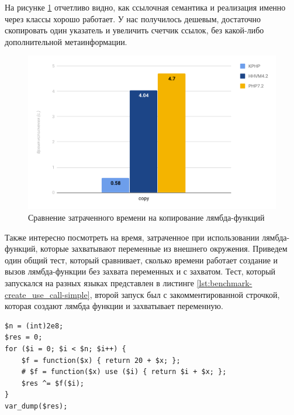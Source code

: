 На рисунке \ref{fig:benchmark-copy-simple} отчетливо видно, как ссылочная семантика и реализация именно через классы хорошо работает.
У нас получилось дешевым, достаточно скопировать один указатель и увеличить счетчик ссылок, без какой-либо дополнительной метаинформации.
\begin{figure}[H]
    \caption{Сравнение затраченного времени на копирование лямбда-функций}
    \label{fig:benchmark-copy-simple}
    \centering
    \includegraphics[width=\linewidth]{images/benchmark_copy_simple}
\end{figure}

Также интересно посмотреть на время, затраченное при использовании лямбда-функций, которые захватывают переменные из внешнего окружения.
Приведем один общий тест, который сравнивает, сколько времени работает создание и вызов лямбда-функции без захвата переменных и с захватом.
Тест, который запускался на разных языках представлен в листинге \ref{lst:benchmark-create_use_call-simple}, второй запуск был с закомментированной строчкой, которая создают лямбда функции и захватывает переменную.
\begin{lstlisting}[caption={Бенчмарк создания и вызова анонимных функций с захватом},label={lst:benchmark-create_use_call-simple}]
$n = (int)2e8;
$res = 0;
for ($i = 0; $i < $n; $i++) {
    $f = function($x) { return 20 + $x; };
    # $f = function($x) use ($i) { return $i + $x; };
    $res ^= $f($i);
}
var_dump($res);
\end{lstlisting}

